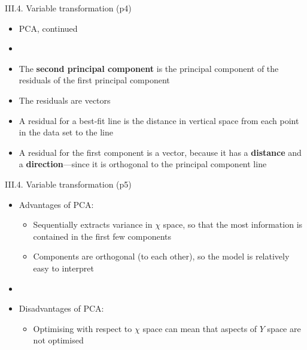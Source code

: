 \documentclass[handout]{beamer}
\newcommand{\strong}[1]{\textbf{\color{teal} #1}}
\begin{document}
\begin{frame}{III.4. Variable transformation (p4)}
\begin{itemize}
\item[] PCA, continued
\item[]
\item The \strong{second principal component} is the principal component of the residuals of the first principal component
\item The residuals are vectors
\item A residual for a best-fit line is the distance in vertical space from each point in the data set to the line
\item A residual for the first component is a vector, because it has a \strong{distance} and a \strong{direction}---since it is orthogonal to the principal component line
\end{itemize}
\end{frame}
\begin{frame}{III.4. Variable transformation (p5)}
\begin{itemize}
\item Advantages of PCA:
	\begin{itemize}
	\item Sequentially extracts variance in $\chi$ space, so that the most information is contained in the first few components
	\item Components are orthogonal (to each other), so the model is relatively easy to interpret
	\end{itemize}
\item[]
\item Disadvantages of PCA:
	\begin{itemize}
	\item Optimising with respect to $\chi$ space can mean that aspects of $Y$ space are not optimised
	\end{itemize}
\end{itemize}
\end{frame}
\end{document}
